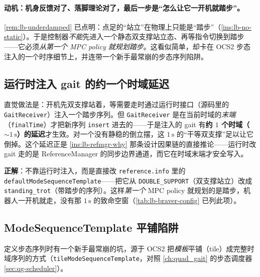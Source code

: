 \paragraph{动机：机身反馈对了、落脚理论对了，最后一步是“怎么让它一开机就踏步”。}
\cref{rem:lb-underdamped} 已点明：点足的“站立”在物理上只能是“踏步”（\cref{ins:lb-no-static}）。于是控制器\emph{不能}先进入一个静态双支撑站立态、再等指令切换到踏步——它必须\emph{从第一个 MPC policy 就规划踏步}。这看似简单，却卡在 OCS2 步态注入的一个时序细节上，并连带一个新手最常崩的步态序列陷阱。

\subsection{运行时注入 gait 的约一个时域延迟}
\label{subsec:lb-gait-delay}

直觉做法是：开机先双支撑站着，等需要走时通过运行时接口（源码里的 \texttt{GaitReceiver}）注入一个踏步序列。但 \texttt{GaitReceiver} 是在当前时域的\emph{末端}（\texttt{finalTime}）才把新序列 \texttt{insert} 进去的——于是注入的 gait 有\textbf{约 $1$ 个时域（$\sim 1\,\mathrm{s}$）的延迟}才生效。对一个没有静稳的倒立摆，这 $1\,\mathrm{s}$ 的“干等双支撑”足以让它倒掉。这个延迟正是 \cref{ins:lb-refmgr-why} 那条设计因果链的直接推论——运行时改 gait 走的是 ReferenceManager 的同步边界通道，而它在时域末端才安全写入。

\textbf{正解}：不靠运行时注入，而是直接改 \texttt{reference.\allowbreak info} 里的 \texttt{defaultModeSequenceTemplate}——把它从 \texttt{DOUBLE\_SUPPORT}（双支撑站立）改成 \texttt{standing\_trot}（带踏步的序列）。这样\emph{第一个} MPC policy 就规划的是踏步，机器人一开机就走，没有那 $1\,\mathrm{s}$ 的致命空窗（\cref{tab:lb-braver-config} 已列此项）。

\subsection{ModeSequenceTemplate 平铺陷阱}
\label{subsec:lb-tile-trap}

定义步态序列时有一个新手最常崩的坑，源于 OCS2 把\emph{模板}平铺（tile）成完整时域序列的方式（\texttt{tileModeSequenceTemplate}，对照 \cref{ch:quad_gait} 的步态调度器 \cref{sec:qg-scheduler}）。

